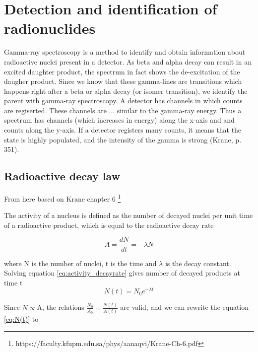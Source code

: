 \documentclass[a4paper,11pt,twoside]{book}
\begin{document}
\section{Detection and identification of radionuclides}
Gamma-ray spectroscopy is a method to identify and obtain information about radioactive nuclei present in a detector. As beta and alpha decay can result in an excited daughter product, the spectrum in fact shows the de-excitation of the daugher product. Since we know that these gamma-lines are transitions which happens right after a beta or alpha decay (or isomer transition), we identify the parent with gamma-ray spectroscopy. A detector has channels in which counts are regiserted. These channels are ... similar to the gamma-ray energy. Thus a spectrum has channels (which increases in energy) along the x-axis and and counts along the y-axis. If a detector registers many counts, it means that the state is highly populated, and the intensity of the gamma is strong (Krane, p. 351). 

\subsection{Radioactive decay law}

From here based on Krane chapter 6 \footnote{https://faculty.kfupm.edu.sa/phys/aanaqvi/Krane-Ch-6.pdf}

The activity of a nucleus is defined as the number of decayed nuclei per unit time of a radioactive product, which is equal to the radioactive decay rate 

\begin{equation} \label{eq:activity_decayrate}
   A =  \frac{dN}{dt}=-\lambda N
\end{equation}

where N is the number of nuclei, t is the time and $\lambda$ is the decay constant. Solving equation \ref{eq:activity_decayrate} gives number of decayed products at time t
\begin{equation} \label{eq:N(t)}
    N(t) = N_0 e^{-\lambda t}
\end{equation}

\noindent 
Since $N\propto$A, the relations $\frac{N_0}{A_0}=\frac{N(t)}{A(t)}$ are valid, and we can rewrite the equation \ref{eq:N(t)} to
\end{document}
